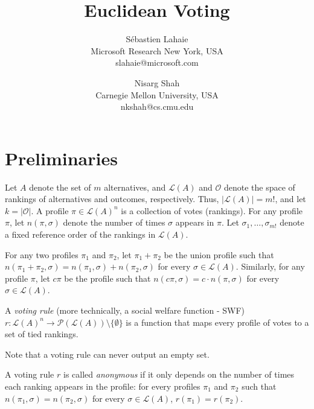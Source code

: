 \documentclass[10pt,letterpaper]{article}
\title{Euclidean Voting}
\author{S\'{e}bastien Lahaie\\Microsoft Research New York, USA\\slahaie@microsoft.com \and Nisarg Shah\\Carnegie Mellon University, USA\\nkshah@cs.cmu.edu}
\date{}
\newcommand{\calL}{{\mathcal{L}}}
\newcommand{\rank}{{\calL(A)}}
\newcommand{\calO}{{\mathcal{O}}}
\newcommand{\calP}{{\mathcal{P}}}
\newenvironment{definition}[1][Definition]{\begin{trivlist}
\item[\hskip \labelsep {\bfseries #1}]}{\end{trivlist}}
\begin{document}
\maketitle


\section{Preliminaries}

Let $A$ denote the set of $m$ alternatives, and $\rank$ and $\calO$ denote the space of rankings of alternatives and outcomes, respectively. Thus, $|\rank| = m!$, and let $k = |\calO|$. A profile $\pi \in \rank^n$ is a collection of votes (rankings). For any profile $\pi$, let $n(\pi,\sigma)$ denote the number of times $\sigma$ appears in $\pi$. Let $\sigma_1,\ldots,\sigma_{m!}$ denote a fixed reference order of the rankings in $\rank$. 

For any two profiles $\pi_1$ and $\pi_2$, let $\pi_1+\pi_2$ be the union profile such that $n(\pi_1+\pi_2,\sigma) = n(\pi_1,\sigma)+n(\pi_2,\sigma)$ for every $\sigma \in \rank$. Similarly, for any profile $\pi$, let $c \pi$ be the profile such that $n(c \pi,\sigma) = c \cdot n(\pi,\sigma)$ for every $\sigma \in \rank$. 


\begin{definition}[Voting Rule]
A \emph{voting rule} (more technically, a social welfare function - SWF) $r : \rank^n \rightarrow \calP(\rank)\setminus\{\emptyset\}$ is a function that maps every profile of votes to a set of tied rankings. 
\end{definition}

Note that a voting rule can never output an empty set.


\begin{definition}[Anonymity]
A voting rule $r$ is called \emph{anonymous} if it only depends on the number of times each ranking appears in the profile: for every profiles $\pi_1$ and $\pi_2$ such that $n(\pi_1,\sigma) = n(\pi_2,\sigma)$ for every $\sigma \in \rank$, $r(\pi_1) = r(\pi_2)$. 
\end{definition}

\end{document}

